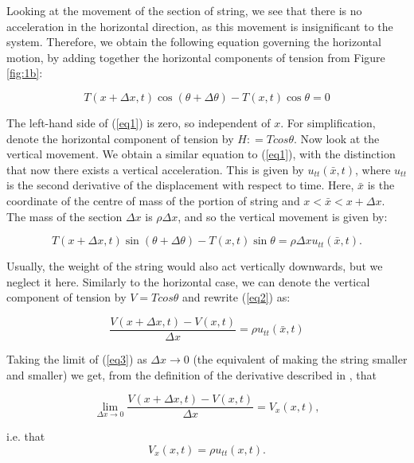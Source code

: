 \documentclass[a4paper, 12pt]{article}
\numberwithin{equation}{section}
\begin{document}
Looking at the movement of the section of string, we see that there is no
acceleration in the horizontal direction, as this movement is insignificant to
the system. Therefore, we obtain the following equation governing the horizontal
motion, by adding together the horizontal components of tension from Figure
\ref{fig:1b}:

\begin {equation} \label{eq1}
    T(x+\Delta x,t)\cos{(\theta + \Delta \theta)}-T(x,t)\cos{\theta}=0
\end {equation}

The left-hand side of (\ref{eq1}) is zero, so independent of $x$. For simplification, 
denote the horizontal component of tension by $H: = Tcos\theta$. 
Now look at the vertical movement. We obtain a similar equation to (\ref{eq1}), with the distinction
that now there exists a vertical acceleration. This is given by $u_{tt} (\bar{x},t)$, 
where $u_{tt}$ is the second derivative of the displacement with respect to time. Here, $\bar{x}$ is 
the coordinate of the centre of mass of the portion of string and $x<\bar{x}<x+\Delta x$. 
The mass of the section $\Delta x$ is $\rho\Delta x$, and so the vertical movement is given by:
 
 \begin{equation} \label{eq2}
    T(x+\Delta x,t)\sin{(\theta + \Delta \theta)}-T(x,t)\sin{\theta}=\rho\Delta x u_{tt} (\bar{x},t).
 \end{equation}

 Usually, the weight of the string would also act vertically downwards, but we
 neglect it here. Similarly to the horizontal case, we can denote the vertical
 component of tension by $V=Tcos\theta$ and rewrite (\ref{eq2}) as:

 \begin{equation} \label{eq3}
    \frac{V(x+\Delta x,t)-V(x,t)}{\Delta x}=\rho u_{tt} (\bar{x},t)
 \end{equation}

 Taking the limit of (\ref{eq3}) as $\Delta x \rightarrow 0$ (the equivalent of
 making the string smaller and smaller) we get, from the definition of the
 derivative described in \cite[Ch. 9]{Spi}, that 

 \begin{equation*}
    \lim_{\Delta x \rightarrow 0}\frac{V(x+\Delta x,t)-V(x,t)}{\Delta x}=V_x(x,t),
 \end{equation*}

i.e. that 
\begin {equation} \label{eq4}
    V_x(x,t)=\rho u_{tt} (x,t).
\end{equation}
\end{document}
